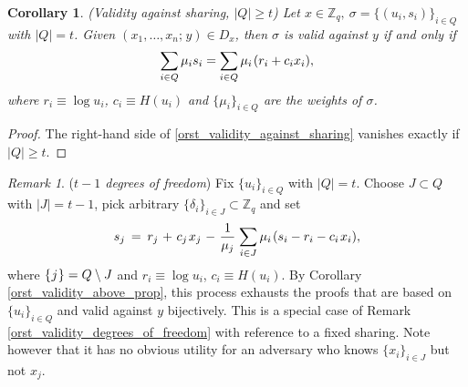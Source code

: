 \documentclass[psamsfonts, reqno]{amsart}
\newtheorem{cor}[thm]{Corollary}
\theoremstyle{definition}
\theoremstyle{remark}
\newtheorem{rem}[thm]{Remark}
\numberwithin{equation}{section}
\begin{document}
\begin{cor}\label{orst_validity_above_prop}
\textup{(\textit{Validity against sharing, $|Q| \ge t$})}
Let $x \in \mathbb{Z}_q,\ \sigma = \{(u_i, s_i)\}_{i \in Q}$
with $|Q| = t$.
Given $(x_1, \dots, x_n;\hspace{1pt} y) \in D_x$,
then $\sigma$ is valid against $y$ if and only if
\vspace{5pt}
\begin{equation}\label{orst_validity_above}
\sum_{i \in Q} \mu_i s_i =
\sum_{i \in Q} \mu_i\hspace{1pt}(r_i + c_i x_i),
\vspace{5pt}
\end{equation}
where $r_i \equiv \log u_i$, $c_i \equiv H(u_i)$
and $\{\mu_i\}_{i \in Q}$
are the weights of $\sigma$.
\end{cor}
\begin{proof}
The right-hand side of \eqref{orst_validity_against_sharing}
vanishes exactly if $|Q| \ge t$.
\end{proof}

\begin{rem}\label{orst_t_1_degrees_of_freedom}
(\textit{$t-1$ degrees of freedom})
Fix $\{u_i\}_{i \in Q}$ with $|Q| = t$.
Choose $J \subset Q$ with $|J| = t - 1$,
pick arbitrary $\{\delta_i\}_{i \in J} \subset \mathbb{Z}_q$
and set
\vspace{5pt}
\begin{equation*}
s_j
	\hspace{2pt}
	=
	\hspace{2pt}
	r_j
	\hspace{1pt}
	+
	\hspace{1pt}
	c_j\hspace{1pt}x_j
	\hspace{1pt}
	-
	\hspace{1pt}
	\frac{1}{\mu_j}
	\hspace{1pt}
	\sum_{i \in J}
		\mu_i
		\hspace{1pt}
		(
			s_i - r_i - c_i\hspace{1pt}x_i
		),
\vspace{5pt}
\end{equation*}
where $\{\hspace{0.5pt}j\hspace{0.5pt}\} = Q \setminus J$ and
$r_i \equiv \log u_i$, $c_i \equiv H(u_i)$.
By Corollary \eqref{orst_validity_above_prop},
this process exhausts the proofs
that are based on $\{u_i\}_{i \in Q}$
and valid against $y$ bijectively.
This is a special case of Remark
\ref{orst_validity_degrees_of_freedom}
with reference to a fixed sharing.
Note however that it has no obvious utility
for an adversary who knows $\{x_i\}_{i \in J}$
but not $x_j$.
\end{rem}
\end{document}
